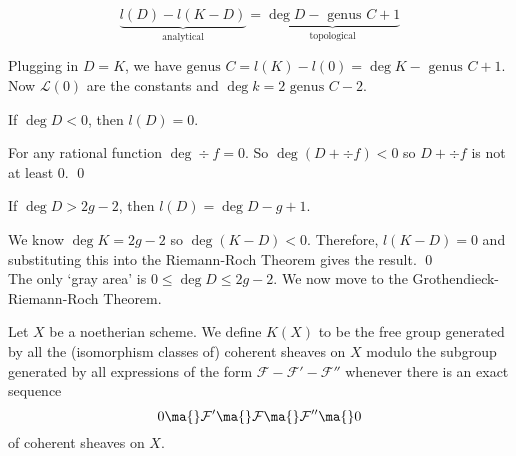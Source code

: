 \begin{thmm}
	\[
	\underbrace{l(D) - l(K-D)}_{\text{analytical}}= \underbrace{\deg D - \text{ genus }C+1}_{\text{topological}}
	\]
\end{thmm}


Plugging in $D=K$, we have $\text{genus }C=l(K)-l(0)=\deg K - \text{ genus }C+1$. Now $\mathcal{L}(0)$ are the constants and $\deg k = 2 \text{ genus }C-2$. 


\begin{lem}
If $\deg D<0$, then $l(D)=0$.
\end{lem}

\pf For any rational function $\deg \div f=0$. So $\deg(D+\div f)<0$ so $D+\div f$ is not at least 0. \qed \\


\begin{prop}
If $\deg D > 2g-2$, then $l(D)=\deg D-g+1$.
\end{prop}

\pf We know $\deg K=2g-2$ so $\deg(K-D)<0$. Therefore, $l(K-D)=0$ and substituting this into the Riemann-Roch Theorem gives the result. \qed \\

The only `gray area' is $0 \leq \deg D \leq 2g-2$. We now move to the Grothendieck-Riemann-Roch Theorem.

\begin{dfn}
Let $X$ be a noetherian scheme. We define $K(X)$ to be the free group generated by all the (isomorphism classes of) coherent sheaves on $X$ modulo the subgroup generated by all expressions of the form $\mathcal{F} - \mathcal{F}' - \mathcal{F}''$ whenever there is an exact sequence
	\[
	0 \ma{} \mathcal{F}' \ma{} \mathcal{F} \ma{} \mathcal{F}'' \ma{} 0
	\]
of coherent sheaves on $X$. 
\end{dfn}

